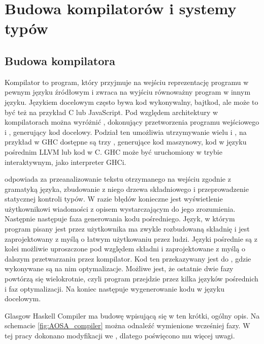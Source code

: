 \chapter{Budowa kompilatorów i systemy typów}\label{chap:teoria}

\section{Budowa kompilatora}\label{sec:budowa_kompilatora}

Kompilator to program, który przyjmuje na wejściu reprezentację programu w
pewnym języku źródłowym i zwraca na wyjściu równoważny program w innym
języku. Językiem docelowym często bywa kod wykonywalny, bajtkod, ale może to być
też na przykład C lub JavaScript. Pod względem architektury w kompilatorach
można wyróżnić , dokonujący przetworzenia programu wejściowego
i , generujący kod docelowy. Podział ten umożliwia utrzymywanie
wielu  i , na przykład w GHC dostępne są
trzy , generujące kod maszynowy, kod w języku pośrednim LLVM
lub kod w C\cite{AOSA}. GHC może być uruchomiony w trybie interaktywnym, jako
interpreter GHCi.

 odpowiada za przeanalizowanie tekstu otrzymanego na wejściu
zgodnie z gramatyką języka, zbudowanie z niego drzewa składniowego i
przeprowadzenie statycznej kontroli typów. W razie błędów konieczne jest
wyświetlenie użytkownikowi wiadomości z opisem wystarczającym do jego
zrozumienia. Następnie następuje faza generowania kodu pośredniego.
Język, w którym program pisany jest przez użytkownika ma zwykle rozbudowaną składnię i jest
zaprojektowany z myślą o łatwym użytkowaniu przez ludzi. Języki pośrednie są z
kolei możliwie uproszczone pod względem składni i zaprojektowane z myślą o
dalszym przetwarzaniu przez kompilator. Kod ten przekazywany jest do
, gdzie wykonywane są na nim optymalizacje. Możliwe jest, że
ostatnie dwie fazy powtórzą się wielokrotnie, czyli program przejdzie przez
kilka języków pośrednich i faz optymalizacji. Na koniec następuje wygenerowanie
kodu w języku docelowym\cite{Dragon}.

Glasgow Haskell Compiler ma budowę wpisującą się w ten krótki, ogólny opis. Na
schemacie \ref{fig:AOSA_compiler} można odnaleźć wymienione wcześniej fazy. W
tej pracy dokonano modyfikacji we , dlatego poświęcono mu
więcej uwagi.

